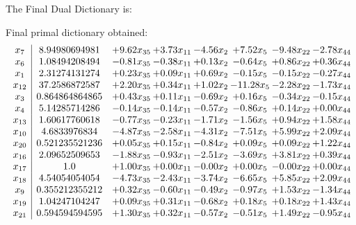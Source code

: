 \documentclass[8pt]{article}
\begin{document}
The Final Dual Dictionary is: 

 Final primal dictionary obtained: 
\[\begin{array}{c| c c@{\hskip 2pt} c@{\hskip 2pt} c@{\hskip 2pt} c@{\hskip 2pt} c@{\hskip 2pt} c@{\hskip 2pt} }
 x_{7}   &  8.94980694981 & +  9.62 x_{35} & +  3.73 x_{11} & -4.56 x_{2} & +  7.52 x_{5} & -9.48 x_{22} & -2.78 x_{44}\\
 x_{6}   &  1.08494208494 & -0.81 x_{35} & -0.38 x_{11} & +  0.13 x_{2} & -0.64 x_{5} & +  0.86 x_{22} & +  0.36 x_{44}\\
 x_{1}   &  2.31274131274 & +  0.23 x_{35} & +  0.09 x_{11} & +  0.69 x_{2} & -0.15 x_{5} & -0.15 x_{22} & -0.27 x_{44}\\
 x_{12}   &  37.2586872587 & +  2.20 x_{35} & +  0.34 x_{11} & +  1.02 x_{2} & -11.28 x_{5} & -2.28 x_{22} & -1.73 x_{44}\\
 x_{3}   &  0.864864864865 & +  0.43 x_{35} & +  0.11 x_{11} & -0.69 x_{2} & +  0.16 x_{5} & -0.34 x_{22} & -0.15 x_{44}\\
 x_{4}   &  5.14285714286 & -0.14 x_{35} & -0.14 x_{11} & -0.57 x_{2} & -0.86 x_{5} & +  0.14 x_{22} & +  0.00 x_{44}\\
 x_{13}   &  1.60617760618 & -0.77 x_{35} & -0.23 x_{11} & -1.71 x_{2} & -1.56 x_{5} & +  0.94 x_{22} & +  1.58 x_{44}\\
 x_{10}   &  4.6833976834 & -4.87 x_{35} & -2.58 x_{11} & -4.31 x_{2} & -7.51 x_{5} & +  5.99 x_{22} & +  2.09 x_{44}\\
 x_{20}   &  0.521235521236 & +  0.05 x_{35} & +  0.15 x_{11} & -0.84 x_{2} & +  0.09 x_{5} & +  0.09 x_{22} & +  1.22 x_{44}\\
 x_{16}   &  2.09652509653 & -1.88 x_{35} & -0.93 x_{11} & -2.51 x_{2} & -3.69 x_{5} & +  3.81 x_{22} & +  0.39 x_{44}\\
 x_{17}   &  1.0 & +  1.00 x_{35} & +  0.00 x_{11} & -0.00 x_{2} & +  0.00 x_{5} & -0.00 x_{22} & +  0.00 x_{44}\\
 x_{18}   &  4.54054054054 & -4.73 x_{35} & -2.43 x_{11} & -3.74 x_{2} & -6.65 x_{5} & +  5.85 x_{22} & +  2.09 x_{44}\\
 x_{9}   &  0.355212355212 & +  0.32 x_{35} & -0.60 x_{11} & -0.49 x_{2} & -0.97 x_{5} & +  1.53 x_{22} & -1.34 x_{44}\\
 x_{19}   &  1.04247104247 & +  0.09 x_{35} & +  0.31 x_{11} & -0.68 x_{2} & +  0.18 x_{5} & +  0.18 x_{22} & +  1.43 x_{44}\\
 x_{21}   &  0.594594594595 & +  1.30 x_{35} & +  0.32 x_{11} & -0.57 x_{2} & -0.51 x_{5} & +  1.49 x_{22} & -0.95 x_{44}\\

\end{array}\]
\end{document}
